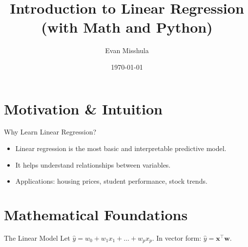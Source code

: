 \documentclass[aspectratio=169]{beamer}
\author{Evan Misshula}
\date{\today}
\title{Introduction to Linear Regression (with Math and Python)}
\begin{document}
\maketitle

\section{Motivation \& Intuition}
\label{sec:orgdf630c0}
\begin{frame}[label={sec:orgdbcf035}]{Why Learn Linear Regression?}
\begin{itemize}
\item Linear regression is the most basic and interpretable predictive model.
\item It helps understand relationships between variables.
\item Applications: housing prices, student performance, stock trends.
\end{itemize}
\end{frame}

\section{Mathematical Foundations}
\label{sec:orga638481}
\begin{frame}[label={sec:org2b966fa}]{The Linear Model}
Let \(\hat{y} = w_0 + w_1 x_1 + \dots + w_p x_p\).
In vector form: \(\hat{y} = \mathbf{x}^\top \mathbf{w}\).
\end{frame}
\end{document}
